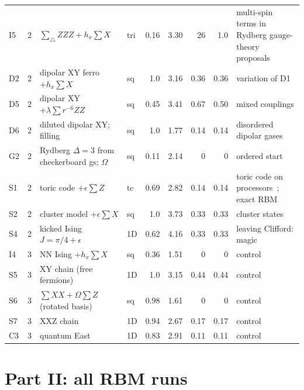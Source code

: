 \documentclass[11pt,a4paper]{article}
\begin{document}
\begin{table}[p]
\begin{tabular}{lcp{3.9cm}lrrrrp{4.2cm}}
    I5 & 2 & $\sum_\triangle ZZZ+h_x\sum X$ & tri & 0.16 & 3.30 & 26 & 1.0 & multi-spin terms in Rydberg gauge-theory proposals~\cite{Celi20}\\
    D2 & 2 & dipolar XY ferro $+h_x\sum X$ & sq & 1.0 & 3.16 & 0.36 & 0.36 & variation of D1\\
    D5 & 2 & dipolar XY $+\lambda\sum r^{-6}ZZ$ & sq & 0.45 & 3.41 & 0.67 & 0.50 & mixed couplings\\
    D6 & 2 & diluted dipolar XY; filling & sq & 1.0 & 1.77 & 0.14 & 0.14 & disordered dipolar gases~\cite{Signoles21}\\
    G2 & 2 & Rydberg $\Delta=3$ from checkerboard gs; $\Omega$ & sq & 0.11 & 2.14 & 0 & 0 & ordered start\\
    S1 & 2 & toric code $+\epsilon\sum Z$ & tc & 0.69 & 2.82 & 0.14 & 0.14 & toric code on processors~\cite{Satzinger21}; exact RBM~\cite{Deng17}\\
    S2 & 2 & cluster model $+\epsilon\sum X$ & sq & 1.0 & 3.73 & 0.33 & 0.33 & cluster states~\cite{Raussendorf01,Bluvstein22}\\
    S4 & 2 & kicked Ising $J=\pi/4+\epsilon$ & 1D & 0.62 & 4.16 & 0.33 & 0.33 & leaving Clifford: magic~\cite{Leone22}\\
    \midrule
    I4 & 3 & NN Ising $+h_x\sum X$ & sq & 0.36 & 1.51 & 0 & 0 & control\\
    S5 & 3 & XY chain (free fermions) & 1D & 1.0 & 3.15 & 0.44 & 0.44 & control\\
    S6 & 3 & $\sum XX+\Omega\sum Z$ (rotated basis) & sq & 0.98 & 1.61 & 0 & 0 & control\\
    S7 & 3 & XXZ chain & 1D & 0.94 & 2.67 & 0.17 & 0.17 & control\\
    C3 & 3 & quantum East & 1D & 0.83 & 2.91 & 0.11 & 0.11 & control\\
    \bottomrule
  \end{tabular}
\end{table}

\section{Part II: all RBM runs}
\label{app:stage3}
\end{document}
